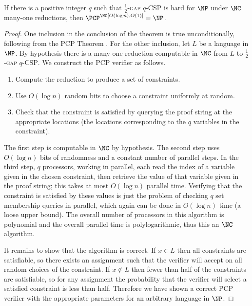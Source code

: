 \begin{lemma}\label{lem:inapprox}
  If there is a positive integer $q$ such that \textsc{$\frac{1}{2}$-gap $q$-CSP} is hard for $\NP$ under $\NC$ many-one reductions, then $\PCP^\NC[O(\log n), O(1)] = \NP$.
\end{lemma}
\begin{proof}
  One inclusion in the conclusion of the theorem is true unconditionally, following from the PCP Theorem \autocite{almss92}.
  For the other inclusion, let $L$ be a language in $\NP$.
  By hypothesis there is a many-one reduction computable in $\NC$ from $L$ to \textsc{$\frac{1}{2}$-gap $q$-CSP}.
  We construct the PCP verifier as follows.
  \begin{enumerate}
  \item Compute the reduction to produce a set of constraints.
  \item Use $O(\log n)$ random bits to choose a constraint uniformly at random.
  \item Check that the constraint is satisfied by querying the proof string at the appropriate locations (the locations corresponding to the $q$ variables in the constraint).
  \end{enumerate}

  The first step is computable in $\NC$ by hypothesis.
  The second step uses $O(\log n)$ bits of randomness and a constant number of parallel steps.
  In the third step, $q$ processors, working in parallel, each read the index of a variable given in the chosen constraint, then retrieve the value of that variable given in the proof string; this takes at most $O(\log n)$ parallel time.
  Verifying that the constraint is satisfied by these values is just the problem of checking $q$ set membership queries in parallel, which again can be done in $O(\log n)$ time (a loose upper bound).
  The overall number of processors in this algorithm is polynomial and the overall parallel time is polylogarithmic, thus this an $\NC$ algorithm.

  It remains to show that the algorithm is correct.
  If $x \in L$ then all constraints are satisfiable, so there exists an assignment such that the verifier will accept on all random choices of the constraint.
  If $x \notin L$ then fewer than half of the constraints are satisfiable, so for any assignment the probability that the verifier will select a satisfied constraint is less than half.
  Therefore we have shown a correct PCP verifier with the appropriate parameters for an arbitrary language in $\NP$.
\end{proof}

